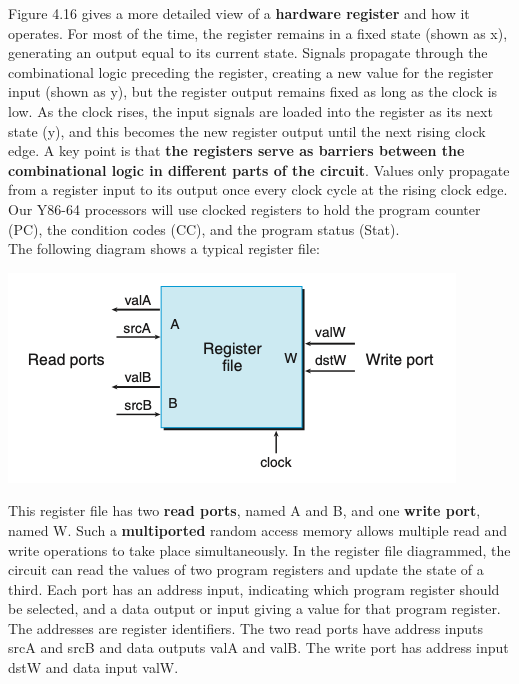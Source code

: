 \documentclass[11pt]{article}
\begin{document}
Figure 4.16 gives a more detailed view of a \textbf{hardware register} and how it operates. For most of the time, the register remains in a fixed state (shown as x), generating an output equal to its current state. Signals propagate through the combinational logic preceding the register, creating a new value for the register input (shown as y), but the register output remains fixed as long as the clock is low. As the clock rises, the input signals are loaded into the register as its next state (y), and this becomes the new register output until the next rising clock edge. A key point is that \textbf{the registers serve as barriers between the combinational logic in different parts of the circuit}. Values only propagate from a register input to its output once every clock cycle at the rising clock edge. Our Y86-64 processors will use clocked registers to hold the program counter (PC), the condition codes (CC), and the program status (Stat).\\

The following diagram shows a typical register file:\\

\begin{center}
\includegraphics[width=.9\linewidth]{pics/typical-register-file.png}
\end{center}

This register file has two \textbf{read ports}, named A and B, and one \textbf{write port}, named W. Such a \textbf{multiported} random access memory allows multiple read and write operations to take place simultaneously. In the register file diagrammed, the circuit can read the values of two program registers and update the state of a third. Each port has an address input, indicating which program register should be selected, and a data output or input giving a value for that program register. The addresses are register identifiers. The two read ports have address inputs srcA and srcB and data outputs valA and valB. The write port has address input dstW and data input valW.\\
\end{document}
